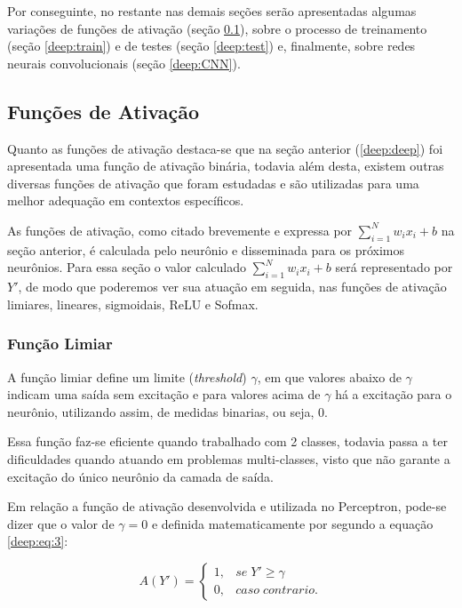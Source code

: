 Por conseguinte, no restante nas demais seções serão apresentadas algumas variações de funções de ativação (seção \ref{deep:activation}), sobre o processo de treinamento (seção \ref{deep:train}) e de testes (seção \ref{deep:test}) e, finalmente, sobre redes neurais convolucionais (seção \ref{deep:CNN}).


\subsection{Funções de Ativação}
\label{deep:activation}

Quanto as funções de ativação destaca-se que na seção anterior (\ref{deep:deep}) foi apresentada uma função de ativação binária, todavia além desta, existem outras diversas funções de ativação que foram estudadas e são utilizadas para uma melhor adequação em contextos específicos.

As funções de ativação, como citado brevemente e expressa por $\sum_{i = 1}^{N} w_ix_i +b$ na seção anterior, é calculada pelo neurônio e disseminada para os próximos neurônios.  Para essa seção o valor calculado $\sum_{i = 1}^{N} w_ix_i +b$ será representado por $Y'$, de modo que poderemos ver sua atuação em seguida, nas funções de ativação limiares, lineares, sigmoidais, ReLU e Sofmax.


\subsubsection{Função Limiar}
A função limiar define um limite (\textit{threshold}) $\gamma$, em que valores abaixo de $\gamma$ indicam uma saída sem excitação e para valores acima de $\gamma$ há a excitação para o neurônio, utilizando assim, de medidas binarias, ou seja, 0.

Essa função faz-se eficiente quando trabalhado com 2 classes, todavia passa a ter dificuldades quando atuando em problemas multi-classes, visto que não garante a excitação do único neurônio da camada de saída.

Em relação a função de ativação desenvolvida e utilizada no Perceptron, pode-se dizer que o valor de $\gamma = 0$ e definida matematicamente por \cite{mcculloch1943logical} segundo a equação \ref{deep:eq:3}:

\begin{equation}
    \label{deep:eq:3}
    A(Y') = \left\{\begin{matrix}
     1,& se \; Y' \geq \gamma \\ 
     0,& caso \; contrario.
    \end{matrix}\right.
\end{equation}


